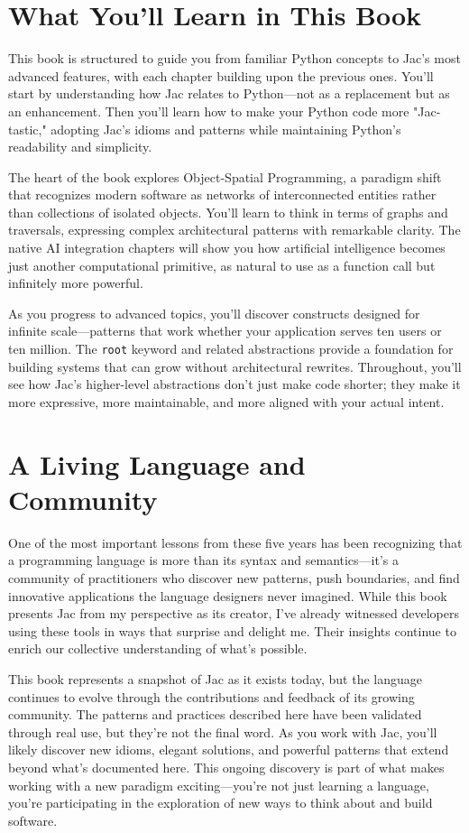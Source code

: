 \section{What You'll Learn in This Book}

This book is structured to guide you from familiar Python concepts to Jac's most advanced features, with each chapter building upon the previous ones. You'll start by understanding how Jac relates to Python—not as a replacement but as an enhancement. Then you'll learn how to make your Python code more "Jac-tastic," adopting Jac's idioms and patterns while maintaining Python's readability and simplicity.

The heart of the book explores Object-Spatial Programming, a paradigm shift that recognizes modern software as networks of interconnected entities rather than collections of isolated objects. You'll learn to think in terms of graphs and traversals, expressing complex architectural patterns with remarkable clarity. The native AI integration chapters will show you how artificial intelligence becomes just another computational primitive, as natural to use as a function call but infinitely more powerful.

As you progress to advanced topics, you'll discover constructs designed for infinite scale—patterns that work whether your application serves ten users or ten million. The \texttt{root} keyword and related abstractions provide a foundation for building systems that can grow without architectural rewrites. Throughout, you'll see how Jac's higher-level abstractions don't just make code shorter; they make it more expressive, more maintainable, and more aligned with your actual intent.

\section{A Living Language and Community}

One of the most important lessons from these five years has been recognizing that a programming language is more than its syntax and semantics—it's a community of practitioners who discover new patterns, push boundaries, and find innovative applications the language designers never imagined. While this book presents Jac from my perspective as its creator, I've already witnessed developers using these tools in ways that surprise and delight me. Their insights continue to enrich our collective understanding of what's possible.

This book represents a snapshot of Jac as it exists today, but the language continues to evolve through the contributions and feedback of its growing community. The patterns and practices described here have been validated through real use, but they're not the final word. As you work with Jac, you'll likely discover new idioms, elegant solutions, and powerful patterns that extend beyond what's documented here. This ongoing discovery is part of what makes working with a new paradigm exciting—you're not just learning a language, you're participating in the exploration of new ways to think about and build software.

